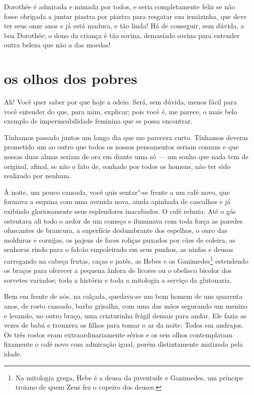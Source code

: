 \quebra

Dorothée é admirada e mimada por todos, e seria completamente feliz se
não fosse obrigada a juntar piastra por piastra para resgatar sua
irmãzinha, que deve ter seus onze anos e já está madura, e tão
linda! Há de conseguir, sem dúvida, a boa Dorothée; o dono da criança é
tão sovina, demasiado sovina para entender outra beleza que não a das
moedas!

\quebra\section[Os olhos dos pobres]{os olhos dos pobres}

Ah! Você quer saber por que hoje a odeio. Será, sem dúvida, menos fácil
para você entender do que, para mim, explicar; pois você é, me
parece, o mais belo exemplo de impermeabilidade feminina que se possa
encontrar.

Tínhamos passado juntos um longo dia que me parecera curto. Tínhamos
deveras prometido um ao outro que todos os nossos pensamentos seriam
comuns e que nossas duas almas seriam de ora em diante uma só ---
um sonho que nada tem de original, afinal, se não o fato de, sonhado 
por todos os homens, não ter sido realizado por nenhum.

À noite, um pouco cansada, você quis sentar"-se frente a um café
novo, que formava a esquina com uma avenida nova, ainda apinhada de
cascalhos e já exibindo gloriosamente seus esplendores inacabados. O
café reluzia. Até o gás ostentava ali todo o ardor de um começo e
iluminava com toda força as paredes ofuscantes de brancura,
a superfície deslumbrante dos espelhos, o ouro das molduras e 
cornijas, os pajens de faces roliças puxados por cães de coleira, as
senhoras rindo para o falcão empoleirado em seus punhos, as ninfas e
deusas carregando na cabeça frutas, caças e patês, as Hebes e os
Ganimedes\protect\footnote{ Na mitologia grega, Hebe é a deusa da juventude e Ganimedes, um
príncipe troiano de quem Zeus fez o copeiro dos deuses.} 
estendendo os braços para oferecer a
pequena ânfora de licores ou o obelisco bicolor dos sorvetes variados;
toda a história e toda a mitologia a serviço da glutonaria.

\quebra

Bem em frente de nós, na calçada, quedava-se um bom homem de uns
quarenta anos, de rosto cansado, barba grisalha, com uma
das mãos segurando um menino e levando, no outro braço, uma criaturinha frágil demais
para andar. Ele fazia as vezes de babá e trouxera os filhos para
tomar o ar da noite. Todos em andrajos. Os três rostos eram
extraordinariamente sérios e os seis olhos contemplavam fixamente o café
novo com admiração igual, porém distintamente matizada pela idade.

